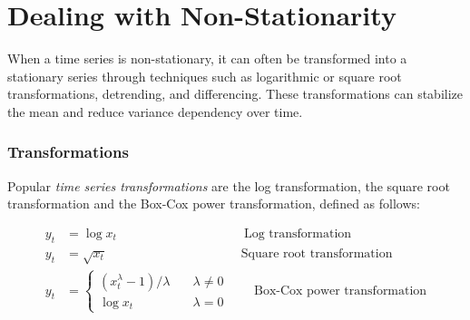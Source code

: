 \begin{samepage}
\end{samepage}

\section{Dealing with Non-Stationarity}

When a time series is non-stationary, it can often be transformed into a stationary series through techniques such as logarithmic or square root transformations, detrending, and differencing. These transformations can stabilize the mean and reduce variance dependency over time.

\subsubsection*{Transformations}

Popular \emph{time series transformations} are the log transformation, the square root transformation and the Box-Cox power transformation, defined as follows:

\begin{align*}y_t &= \log x_t \qquad \qquad \qquad \qquad \qquad \text{Log transformation}\\
  y_t &= \sqrt{x_t} \qquad \qquad \; \; \qquad \qquad \qquad \text{Square root transformation} \\
  y_t &= \begin{cases}(x_t^\lambda-1)/\lambda &\quad \lambda\neq0 \\
  \log x_t &\quad \lambda=0
  \end{cases} \qquad \text{Box-Cox power transformation}
\end{align*}

